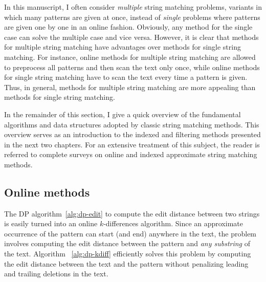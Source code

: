 In this manuscript, I often consider \emph{multiple} string matching problems, \ie variants in which many patterns are given at once, instead of \emph{single} problems where patterns are given one by one in an online fashion.
Obviously, any method for the single case can solve the multiple case and vice versa.
However, it is clear that methods for multiple string matching have advantages over methods for single string matching.
For instance, online methods for multiple string matching are allowed to preprocess all patterns and then scan the text only once, while online methods for single string matching have to scan the text every time a pattern is given.
Thus, in general, methods for multiple string matching are more appealing than methods for single string matching.

In the remainder of this section, I give a quick overview of the fundamental algorithms and data structures adopted by classic string matching methods.
This overview serves as an introduction to the indexed and filtering methods presented in the next two chapters.
For an extensive treatment of this subject, the reader is referred to complete surveys on online \citep{Navarro2001a} and indexed \citep{Navarro2001} approximate string matching methods.


\subsection{Online methods}
\label{sub:introonline}


The DP algorithm~\ref{alg:dp-edit} to compute the edit distance between two strings is easily turned into an online $k$-differences algorithm.
Since an approximate occurrence of the pattern can start (and end) anywhere in the text, the problem involves computing the edit distance between the pattern and \emph{any substring} of the text.
Algorithm ~\ref{alg:dp-kdiff} efficiently solves this problem by computing the edit distance between the text and the pattern without penalizing leading and trailing deletions in the text.


